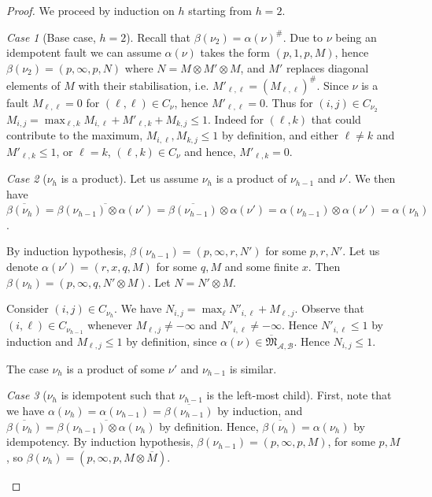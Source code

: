 \documentclass{lmcs}
\theoremstyle{remark}
\newtheorem{case}{Case}
\newcommand{\ideal}{\mathfrak{M}}
\newcommand{\autA}{\mathcal{A}}
\newcommand{\autB}{\mathcal{B}}
\theoremstyle{remark}
\begin{document}
\begin{proof}
We proceed by induction on $h$ starting from $h=2$.

\begin{case}[Base case, $h=2$]

Recall that $\beta(\nu_2) = \alpha(\nu)^\#$. Due to $\nu$ being an idempotent fault we can assume $\alpha(\nu)$ takes the form $(p,1,p,M)$, hence $\beta(\nu_2) = (p,\infty,p, N)$ where $N = M \otimes M' \otimes M$, and $M'$ replaces diagonal elements of $M$ with their stabilisation, i.e. $M'_{\ell,\ell}=(M_{\ell,\ell})^{\#}$. Since $\nu$ is a fault $M_{\ell,\ell} = 0$ for $(\ell,\ell) \in C_{\nu}$, hence $M'_{\ell,\ell} = 0$. Thus for $(i,j)\in C_{\nu_2}$ $M_{i,j} = \max_{\ell,k} M_{i,\ell}+ M'_{\ell,k} +  M_{k,j} \le 1$. Indeed for $(\ell,k)$ that could contribute to the maximum, $ M_{i,\ell}, M_{k,j} \le 1$ by definition, and either $\ell \neq k$ and $M'_{\ell,k} \le 1$, or $\ell = k$, $(\ell,k) \in C_{\nu}$ and hence, $M'_{\ell,k} = 0$. 
\end{case}

\begin{case}[$\nu_h$ is a product]
Let us assume $\nu_h$ is a product of $\nu_{h-1}$ and $\nu'$.
We then have $\overline{\beta(\nu_h)} = \overline{\beta(\nu_{h-1}) \otimes \alpha(\nu')} = \overline{\beta(\nu_{h-1})} \otimes \alpha(\nu') = \alpha(\nu_{h-1}) \otimes \alpha(\nu') = \alpha(\nu_{h})$.

By induction hypothesis,  $\beta(\nu_{h-1}) = (p,\infty,r,N')$ for some $p,r, N'$. Let us denote $\alpha(\nu') = (r,x,q,M)$ for some $q,M$ and some finite $x$. Then $\beta(\nu_h) = (p,\infty,q,N'\otimes M)$. Let $N = N'\otimes M$.

Consider $(i,j) \in C_{\nu_h}$. We have $N_{i,j} = \max_{\ell} N'_{i,\ell} + M_{\ell,j}$. Observe that $(i,\ell)\in C_{\nu_{h-1}}$ whenever $M_{\ell,j} \ne -\infty$ and $N'_{i,\ell} \ne -\infty$. Hence $N'_{i,\ell} \le 1$ by induction and $M_{\ell,j}\le 1$ by definition, since $\alpha(\nu) \in\overline{\ideal}_{\autA,\autB}$. Hence $N_{i,j} \le 1$.

The case $\nu_h$ is a product of some $\nu'$ and $\nu_{h-1}$ is similar.
\end{case}

\begin{case}[$\nu_h$ is idempotent such that $\nu_{h-1}$ is the left-most child]

First, note that we have $\alpha(\nu_h) = \alpha(\nu_{h-1})= \overline{\beta(\nu_{h-1})}$ by induction, and $\overline{\beta(\nu_{h})} = \overline{\beta(\nu_{h-1}) \otimes \alpha(\nu_{h})}$ by definition. Hence, $\overline{\beta(\nu_{h})} = \alpha(\nu_h)$ by idempotency. By induction hypothesis, $\beta(\nu_{h-1}) = (p,\infty,p,M)$, for some $p,M$, so $\beta(\nu_h)= (p,\infty,p,M\otimes \overline{M})$. 


\end{case}
\end{proof}
\end{document}
